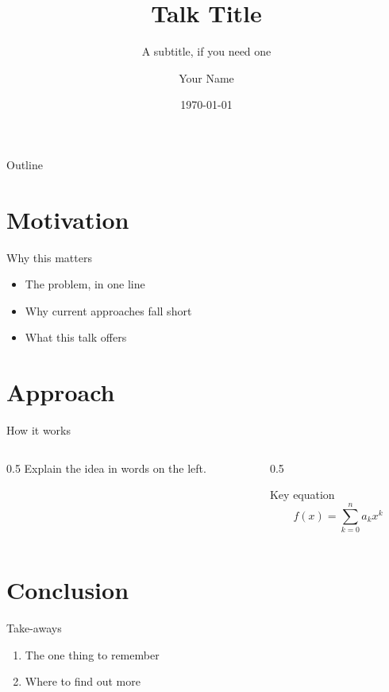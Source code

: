 \documentclass[aspectratio=169]{beamer}
\title{Talk Title}
\subtitle{A subtitle, if you need one}
\author{Your Name}
\institute{Your Institution}
\date{\today}
\begin{document}
\begin{frame}
  \titlepage
\end{frame}

\begin{frame}{Outline}
  \tableofcontents
\end{frame}

\section{Motivation}
\begin{frame}{Why this matters}
  \begin{itemize}
    \item<1-> The problem, in one line
    \item<2-> Why current approaches fall short
    \item<3-> What this talk offers
  \end{itemize}
\end{frame}

\section{Approach}
\begin{frame}{How it works}
  \begin{columns}
    \begin{column}{0.5\textwidth}
      Explain the idea in words on the left.
    \end{column}
    \begin{column}{0.5\textwidth}
      \begin{block}{Key equation}
        \[ f(x) = \sum_{k=0}^{n} a_k x^k \]
      \end{block}
    \end{column}
  \end{columns}
\end{frame}

\section{Conclusion}
\begin{frame}{Take-aways}
  \begin{enumerate}
    \item The one thing to remember
    \item Where to find out more
  \end{enumerate}
\end{frame}
\end{document}
